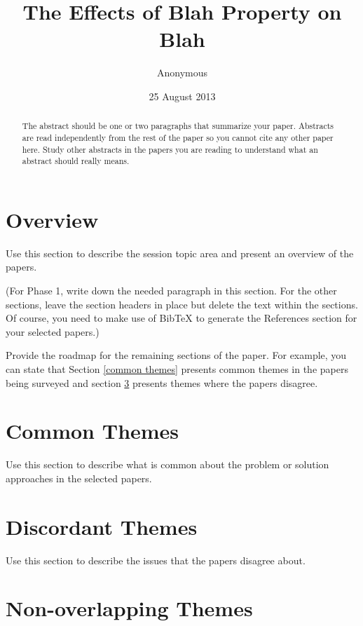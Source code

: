 \documentclass{sig-alternate}
\begin{document}
\title{The Effects of Blah Property on Blah}
\author{
\alignauthor
Anonymous
}
\date{25 August 2013}
\maketitle
\begin{abstract}
  The abstract should be one or two paragraphs that summarize your
  paper. Abstracts are read independently from the rest of the paper
  so you cannot cite any other paper here. Study other abstracts in
  the papers you are reading to understand what an abstract should
  really means.
\end{abstract}

\section{Overview}
\label{overview}

Use this section to describe the session topic area and
present an overview of the papers.

(For Phase 1, write down the needed
paragraph in this section. For the other sections, leave the section
headers in place but delete the text within the sections. Of course,
you need to make use of BibTeX to generate the References section for
your selected papers.)

Provide the roadmap for the remaining sections of the
paper. For example, you can state that Section \ref{common
  themes} presents common themes in the papers being
surveyed and section \ref{discordant themes} presents
themes where the papers disagree.  

\section{Common Themes}
\label{common themes}

Use this section to describe what is common about the
problem or solution approaches in the selected papers.

\section{Discordant Themes}
\label{discordant themes}

Use this section to describe the issues that the papers
disagree about.

\section{Non-overlapping Themes}
\label{non-overlapping themes}
\end{document}
